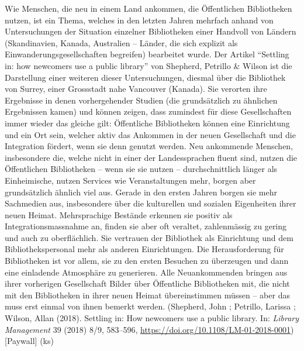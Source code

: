\documentclass[a4paper,
fontsize=11pt,
oneside,
numbers=noperiodatend,
parskip=half-,
bibliography=totoc,
final
]{scrartcl}
\begin{document}
Wie Menschen, die neu in einem Land ankommen, die Öffentlichen
Bibliotheken nutzen, ist ein Thema, welches in den letzten Jahren
mehrfach anhand von Untersuchungen der Situation einzelner Bibliotheken
einer Handvoll von Ländern (Skandinavien, Kanada, Australien -- Länder,
die sich explizit als Einwanderungsgesellschaften begreifen) bearbeitet
wurde. Der Artikel \enquote{Settling in: how newcomers use a public
library} von Shepherd, Petrillo \& Wilson ist die Darstellung einer
weiteren dieser Untersuchungen, diesmal über die Bibliothek von Surrey,
einer Grossstadt nahe Vancouver (Kanada). Sie verorten ihre Ergebnisse
in denen vorhergehender Studien (die grundsätzlich zu ähnlichen
Ergebnissen kamen) und können zeigen, dass zumindest für diese
Gesellschaften immer wieder das gleiche gilt: Öffentliche Bibliotheken
können eine Einrichtung und ein Ort sein, welcher aktiv das Ankommen in
der neuen Gesellschaft und die Integration fördert, wenn sie denn
genutzt werden. Neu ankommende Menschen, insbesondere die, welche nicht
in einer der Landessprachen fluent sind, nutzen die Öffentlichen
Bibliotheken -- wenn sie sie nutzen -- durchschnittlich länger als
Einheimische, nutzen Services wie Veranstaltungen mehr, borgen aber
grundsätzlich ähnlich viel aus. Gerade in den ersten Jahren borgen sie
mehr Sachmedien aus, insbesondere über die kulturellen und sozialen
Eigenheiten ihrer neuen Heimat. Mehrsprachige Bestände erkennen sie
positiv als Integrationsmassnahme an, finden sie aber oft veraltet,
zahlenmässig zu gering und auch zu oberflächlich. Sie vertrauen der
Bibliothek als Einrichtung und dem Bibliothekspersonal mehr als anderen
Einrichtungen. Die Herausforderung für Bibliotheken ist vor allem, sie
zu den ersten Besuchen zu überzeugen und dann eine einladende Atmosphäre
zu generieren. Alle Neuankommenden bringen aus ihrer vorherigen
Gesellschaft Bilder über Öffentliche Bibliotheken mit, die nicht mit den
Bibliotheken in ihrer neuen Heimat übereinstimmen müssen -- aber das
muss erst einmal von ihnen bemerkt werden. (Shepherd, John ; Petrillo,
Larissa ; Wilson, Allan (2018). Settling in: How newcomers use a public
library. In: \emph{Library Management} 39 (2018) 8/9, 583--596,
\url{https://doi.org/10.1108/LM-01-2018-0001}) {[}Paywall{]} (ks)
\end{document}

